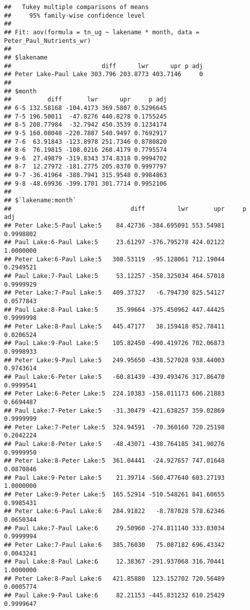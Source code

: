 \documentclass[]{article}
\begin{document}
\begin{verbatim}
##   Tukey multiple comparisons of means
##     95% family-wise confidence level
## 
## Fit: aov(formula = tn_ug ~ lakename * month, data = Peter_Paul_Nutrients_wr)
## 
## $lakename
##                         diff      lwr      upr p adj
## Peter Lake-Paul Lake 303.796 203.8773 403.7146     0
## 
## $month
##          diff       lwr      upr     p adj
## 6-5 132.58168 -104.4173 369.5807 0.5296645
## 7-5 196.50011  -47.8276 440.8278 0.1755245
## 8-5 208.77984  -32.7942 450.3539 0.1234174
## 9-5 160.08048 -220.7887 540.9497 0.7692917
## 7-6  63.91843 -123.8978 251.7346 0.8780820
## 8-6  76.19815 -108.0216 260.4179 0.7795574
## 9-6  27.49879 -319.8343 374.8318 0.9994702
## 8-7  12.27972 -181.2775 205.8370 0.9997797
## 9-7 -36.41964 -388.7941 315.9548 0.9984863
## 9-8 -48.69936 -399.1701 301.7714 0.9952106
## 
## $`lakename:month`
##                                 diff         lwr       upr     p adj
## Peter Lake:5-Paul Lake:5    84.42736 -384.695091 553.54981 0.9998802
## Paul Lake:6-Paul Lake:5     23.61297 -376.795278 424.02122 1.0000000
## Peter Lake:6-Paul Lake:5   308.53119  -95.128061 712.19044 0.2949521
## Paul Lake:7-Paul Lake:5     53.12257 -358.325034 464.57018 0.9999929
## Peter Lake:7-Paul Lake:5   409.37327   -6.794730 825.54127 0.0577843
## Paul Lake:8-Paul Lake:5     35.99664 -375.450962 447.44425 0.9999998
## Peter Lake:8-Paul Lake:5   445.47177   38.159418 852.78411 0.0206524
## Paul Lake:9-Paul Lake:5    105.82450 -490.419726 702.06873 0.9998933
## Peter Lake:9-Paul Lake:5   249.95650 -438.527028 938.44003 0.9743614
## Paul Lake:6-Peter Lake:5   -60.81439 -439.493476 317.86470 0.9999541
## Peter Lake:6-Peter Lake:5  224.10383 -158.011173 606.21883 0.6694487
## Paul Lake:7-Peter Lake:5   -31.30479 -421.638257 359.02869 0.9999999
## Peter Lake:7-Peter Lake:5  324.94591  -70.360160 720.25198 0.2042224
## Paul Lake:8-Peter Lake:5   -48.43071 -438.764185 341.90276 0.9999950
## Peter Lake:8-Peter Lake:5  361.04441  -24.927657 747.01648 0.0870846
## Paul Lake:9-Peter Lake:5    21.39714 -560.477640 603.27193 1.0000000
## Peter Lake:9-Peter Lake:5  165.52914 -510.548261 841.60655 0.9985431
## Peter Lake:6-Paul Lake:6   284.91822   -8.787028 578.62346 0.0650344
## Paul Lake:7-Paul Lake:6     29.50960 -274.811140 333.83034 0.9999994
## Peter Lake:7-Paul Lake:6   385.76030   75.087182 696.43342 0.0043241
## Paul Lake:8-Paul Lake:6     12.38367 -291.937068 316.70441 1.0000000
## Peter Lake:8-Paul Lake:6   421.85880  123.152702 720.56489 0.0005774
## Paul Lake:9-Paul Lake:6     82.21153 -445.831232 610.25429 0.9999647

\end{verbatim}
\end{document}
